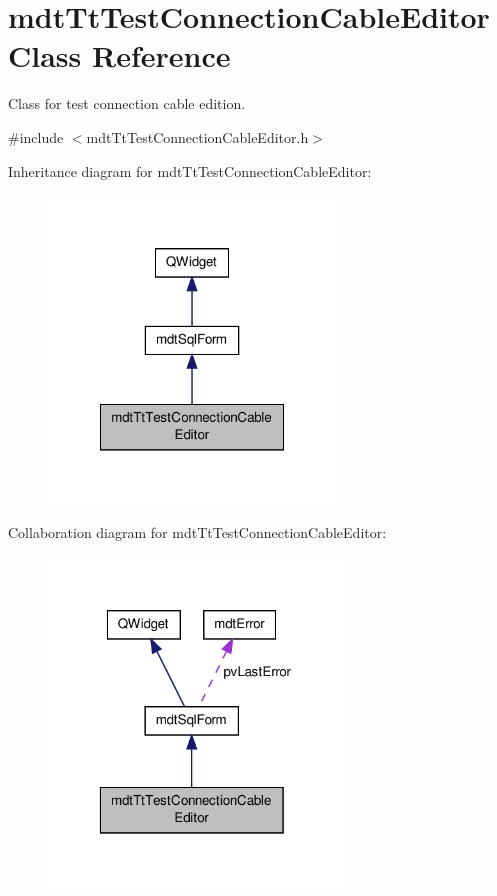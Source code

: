 \hypertarget{classmdt_tt_test_connection_cable_editor}{\section{mdt\-Tt\-Test\-Connection\-Cable\-Editor Class Reference}
\label{classmdt_tt_test_connection_cable_editor}
}


Class for test connection cable edition.  




{\ttfamily \#include $<$mdt\-Tt\-Test\-Connection\-Cable\-Editor.\-h$>$}



Inheritance diagram for mdt\-Tt\-Test\-Connection\-Cable\-Editor\-:\nopagebreak
\begin{figure}[H]
\begin{center}
\leavevmode
\includegraphics[width=216pt]{classmdt_tt_test_connection_cable_editor__inherit__graph}
\end{center}
\end{figure}


Collaboration diagram for mdt\-Tt\-Test\-Connection\-Cable\-Editor\-:\nopagebreak
\begin{figure}[H]
\begin{center}
\leavevmode
\includegraphics[width=223pt]{classmdt_tt_test_connection_cable_editor__coll__graph}
\end{center}
\end{figure}
